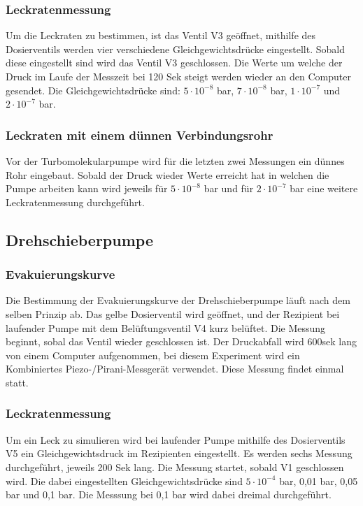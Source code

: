 \subsubsection{Leckratenmessung}
Um die Leckraten zu bestimmen, ist das Ventil V3 geöffnet, mithilfe des Dosierventils werden vier verschiedene 
Gleichgewichtsdrücke eingestellt. Sobald diese eingestellt sind wird das Ventil V3 geschlossen. Die Werte um welche der Druck
im Laufe der Messzeit bei 120 Sek steigt werden wieder an den Computer gesendet. Die Gleichgewichtsdrücke sind:
$5\cdot 10^{-8}$ bar, $7\cdot 10^{-8}$ bar, $1\cdot 10^{-7}$ und $2\cdot 10^{-7}$ bar.

\subsubsection{Leckraten mit einem dünnen Verbindungsrohr}
Vor der Turbomolekularpumpe wird für die letzten zwei Messungen ein dünnes Rohr eingebaut. Sobald der Druck wieder Werte erreicht hat in 
welchen die Pumpe arbeiten kann wird jeweils für $5\cdot 10^{-8}$ bar und für $2\cdot 10^{-7}$ bar eine weitere Leckratenmessung durchgeführt.


\subsection{Drehschieberpumpe}
\subsubsection{Evakuierungskurve}

Die Bestimmung der Evakuierungskurve der Drehschieberpumpe läuft nach dem selben Prinzip ab. Das gelbe Dosierventil wird geöffnet,
und der Rezipient bei laufender Pumpe mit dem Belüftungsventil V4 kurz belüftet. Die Messung beginnt, sobal das Ventil wieder geschlossen
ist. Der Druckabfall wird 600sek lang von einem Computer aufgenommen, bei diesem Experiment wird ein Kombiniertes Piezo-/Pirani-Messgerät
verwendet. Diese Messung findet einmal statt.

\subsubsection{Leckratenmessung}
Um ein Leck zu simulieren wird bei laufender Pumpe mithilfe des Dosierventils V5 ein Gleichgewichtsdruck im Rezipienten eingestellt.
Es werden sechs Messung durchgeführt, jeweils 200 Sek lang. Die Messung startet, sobald V1 geschlossen wird. Die dabei eingestellten 
Gleichgewichtsdrücke sind $5\cdot 10^{-4}$ bar, 0,01 bar, 0,05 bar und 0,1 bar. Die Messsung bei 0,1 bar wird dabei dreimal durchgeführt.





